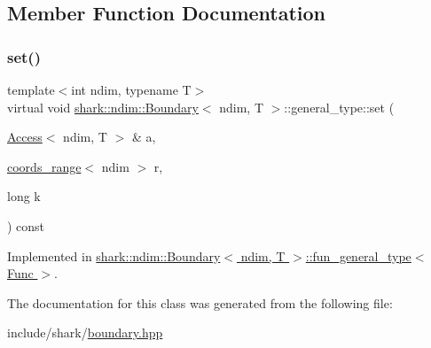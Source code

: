 \subsection{Member Function Documentation}
\hypertarget{classshark_1_1ndim_1_1_boundary_1_1general__type_ac73340187c707591d7fc1ccbe85c1b19}{}\label{classshark_1_1ndim_1_1_boundary_1_1general__type_ac73340187c707591d7fc1ccbe85c1b19} 
\subsubsection{\texorpdfstring{set()}{set()}}
{\footnotesize\ttfamily template$<$int ndim, typename T$>$ \\
virtual void \hyperlink{classshark_1_1ndim_1_1_boundary}{shark\+::ndim\+::\+Boundary}$<$ ndim, T $>$\+::general\+\_\+type\+::set (\begin{DoxyParamCaption}\item[{\hyperlink{classshark_1_1ndim_1_1_access}{Access}$<$ ndim, T $>$ \&}]{a,  }\item[{\hyperlink{structshark_1_1ndim_1_1coords__range}{coords\+\_\+range}$<$ ndim $>$}]{r,  }\item[{long}]{k }\end{DoxyParamCaption}) const\hspace{0.3cm}{\ttfamily [pure virtual]}}



Implemented in \hyperlink{classshark_1_1ndim_1_1_boundary_1_1fun__general__type_a7f5d89a026065de5a42b757ce507a70f}{shark\+::ndim\+::\+Boundary$<$ ndim, T $>$\+::fun\+\_\+general\+\_\+type$<$ Func $>$}.



The documentation for this class was generated from the following file\+:\begin{DoxyCompactItemize}
\item 
include/shark/\hyperlink{boundary_8hpp}{boundary.\+hpp}\end{DoxyCompactItemize}
